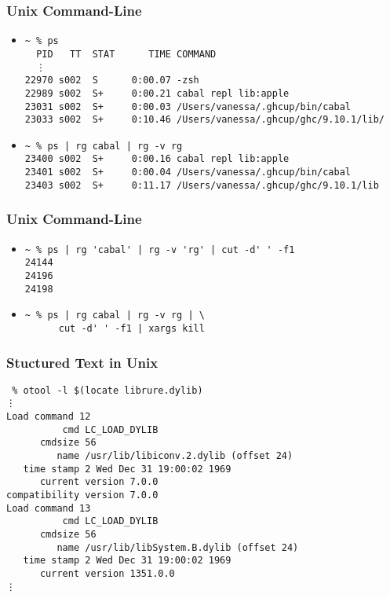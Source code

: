 \documentclass{beamer}
\begin{document}
\begin{frame}[fragile]
  \frametitle{Unix Command-Line}
  \begin{itemize}
    \item
      \begin{verbatim}
~ % ps
  PID   TT  STAT      TIME COMMAND
  ⋮
22970 s002  S      0:00.07 -zsh
22989 s002  S+     0:00.21 cabal repl lib:apple
23031 s002  S+     0:00.03 /Users/vanessa/.ghcup/bin/cabal
23033 s002  S+     0:10.46 /Users/vanessa/.ghcup/ghc/9.10.1/lib/
      \end{verbatim}
      \item
        \begin{verbatim}
~ % ps | rg cabal | rg -v rg
23400 s002  S+     0:00.16 cabal repl lib:apple
23401 s002  S+     0:00.04 /Users/vanessa/.ghcup/bin/cabal
23403 s002  S+     0:11.17 /Users/vanessa/.ghcup/ghc/9.10.1/lib
        \end{verbatim}
  \end{itemize}
\end{frame}

\begin{frame}[fragile]
  \frametitle{Unix Command-Line}
  \begin{itemize}
      \item
        \begin{verbatim}
~ % ps | rg 'cabal' | rg -v 'rg' | cut -d' ' -f1
24144
24196
24198
        \end{verbatim}
      \item
        \begin{verbatim}
~ % ps | rg cabal | rg -v rg | \
      cut -d' ' -f1 | xargs kill
        \end{verbatim}
    \end{itemize}
\end{frame}

\begin{frame}[fragile]
  \frametitle{Stuctured Text in Unix}
    \begin{verbatim}
 % otool -l $(locate librure.dylib)
⋮
Load command 12
          cmd LC_LOAD_DYLIB
      cmdsize 56
         name /usr/lib/libiconv.2.dylib (offset 24)
   time stamp 2 Wed Dec 31 19:00:02 1969
      current version 7.0.0
compatibility version 7.0.0
Load command 13
          cmd LC_LOAD_DYLIB
      cmdsize 56
         name /usr/lib/libSystem.B.dylib (offset 24)
   time stamp 2 Wed Dec 31 19:00:02 1969
      current version 1351.0.0
⋮
    \end{verbatim}

\end{frame}
\end{document}
